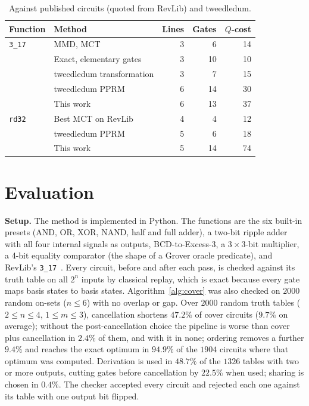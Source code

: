 \documentclass[conference]{IEEEtran}
\theoremstyle{plain}
\begin{document}
\begin{table}[t]
\centering
\caption{Against published circuits (quoted from RevLib) and tweedledum.}
\label{tab:head2head}
\footnotesize
\begin{tabular}{@{}llrrr@{}}
\toprule
Function & Method & Lines & Gates & $Q$-cost\\
\midrule
\texttt{3\_17} & MMD, MCT~\cite{miller2003} & 3 & 6 & 14\\
 & Exact, elementary gates~\cite{grosse2008} & 3 & 10 & 10\\
 & tweedledum transformation & 3 & 7 & 15\\
 & tweedledum PPRM & 6 & 14 & 30\\
 & This work & 6 & 13 & 37\\
\midrule
\texttt{rd32} & Best MCT on RevLib~\cite{revlib2008} & 4 & 4 & 12\\
 & tweedledum PPRM & 5 & 6 & 18\\
 & This work & 5 & 14 & 74\\
\bottomrule
\end{tabular}
\end{table}

\section{Evaluation}
\textbf{Setup.} The method is implemented in Python. The functions are
the six built-in presets (AND, OR, XOR, NAND, half and full adder), a
two-bit ripple adder with all four internal signals as outputs,
BCD-to-Excess-3, a $3\times3$-bit multiplier, a 4-bit equality
comparator (the shape of a Grover oracle predicate), and RevLib's
\texttt{3\_17}~\cite{revlib2008}. Every circuit, before and after each
pass, is checked against its truth table on all $2^n$ inputs by classical
replay, which is exact because every gate maps basis states to basis
states. Algorithm~\ref{alg:cover} was also checked on $2000$ random
on-sets ($n\le6$) with no overlap or gap. Over $2000$ random truth tables
($2\le n\le4$, $1\le m\le3$), cancellation shortens $47.2\%$ of cover
circuits ($9.7\%$ on average); without the post-cancellation choice the
pipeline is worse than cover plus cancellation in $2.4\%$ of them, and
with it in none; ordering removes a further $9.4\%$ and reaches the
exact optimum in $94.9\%$ of the $1904$ circuits where that optimum was
computed. Derivation is used in $48.7\%$ of the $1326$ tables with two
or more outputs, cutting gates before cancellation by $22.5\%$ when
used; sharing is chosen in $0.4\%$. The checker accepted every circuit
and rejected each one against its table with one output bit flipped.
\end{document}
